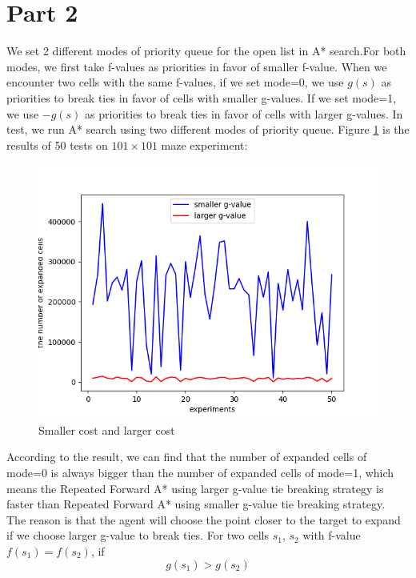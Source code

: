 \documentclass[11pt]{article}
\begin{document}

\section*{Part 2}



We set 2 different modes of priority queue for the open list in A* search.For both modes, we first take f-values as priorities in favor of smaller f-value. When we encounter two cells with the same f-values, if we set mode=0,  we use $g(s)$ as priorities to break ties in favor of cells with smaller g-values. If we set mode=1, we use $-g(s)$ as priorities to break ties in favor of cells with larger g-values. In test, we run A* search using two different modes of priority queue. Figure \ref{fig:Fig2.S&L} is the results of 50 tests on $101\times 101$ maze experiment:
\begin{figure}[htb]
	\centering
	\includegraphics[scale = 0.3]{smaller_g_and_larger_g.png}
	\caption{Smaller cost and larger cost}
	\label{fig:Fig2.S&L}
\end{figure}
\newline
According to the result, we can find that the number of expanded cells of mode=0 is always bigger than the number of expanded cells of mode=1, which means the Repeated Forward A* using larger g-value tie breaking strategy is faster than Repeated Forward A* using smaller g-value tie breaking strategy.\\
The reason is that the agent will choose the point closer to the target to expand if we choose larger g-value to break ties. For two cells $s_1$, $s_2$ with f-value $f(s_1)=f(s_2)$, if $$g(s_1)>g(s_2)$$
\end{document}
